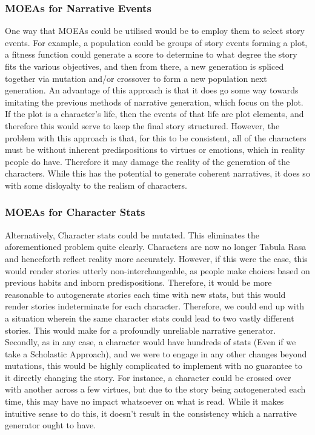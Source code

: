 \documentclass[11pt]{article}
\begin{document}
\subsubsection{MOEAs for Narrative Events}
One way that MOEAs could be utilised would be to employ them to select story events. For example, a population could be groups of story events forming a plot, a fitness function could generate a score to determine to what degree the story fits the various objectives, and then from there, a new generation is spliced together via mutation and/or crossover to form a new population next generation. An advantage of this approach is that it does go some way towards imitating the previous methods of narrative generation, which focus on the plot. If the plot is a character's life, then the events of that life are plot elements, and therefore this would serve to keep the final story structured. However, the problem with this approach is that, for this to be consistent, all of the characters must be without inherent predispositions to virtues or emotions, which in reality people do have. Therefore it may damage the reality of the generation of the characters. While this has the potential to generate coherent narratives, it does so with some disloyalty to the realism of characters.  \\
\subsubsection{MOEAs for Character Stats} 
Alternatively, Character stats could be mutated. This eliminates the aforementioned problem quite clearly. Characters are now no longer Tabula Rasa and henceforth reflect reality more accurately. However, if this were the case, this would render stories utterly non-interchangeable, as people make choices based on previous habits and inborn predispositions. Therefore, it would be more reasonable to autogenerate stories each time with new stats, but this would render stories indeterminate for each character. Therefore, we could end up with a situation wherein the same character stats could lead to two vastly different stories. This would make for a profoundly unreliable narrative generator. Secondly, as in any case, a character would have hundreds of stats (Even if we take a Scholastic Approach), and we were to engage in any other changes beyond mutations, this would be highly complicated to implement with no guarantee to it directly changing the story. For instance, a character could be crossed over with another across a few virtues, but due to the story being autogenerated each time, this may have no impact whatsoever on what is read. While it makes intuitive sense to do this, it doesn't result in the consistency which a narrative generator ought to have. \\
\end{document}
